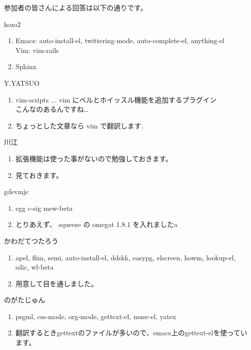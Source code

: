 \documentclass[mingoth,a4paper]{jsarticle}
\begin{document}
参加者の皆さんによる回答は以下の通りです。

\begin{prework}{ kozo2 }
  \begin{enumerate}
  \item Emacs: auto-install-el, twittering-mode, auto-complete-el, anything-el\\
    Vim: vim-rails
  \item Sphinx
  \end{enumerate}
\end{prework}

\begin{prework}{ Y.YATSUO }
  \begin{enumerate}
  \item vim-scripts ... vim にベルとホイッスル機能を追加するプラグイン \\
    こんなのあるんですね…
  \item ちょっとした文章なら vim で翻訳します.
  \end{enumerate}
\end{prework}

\begin{prework}{ 川江 }
  \begin{enumerate}
  \item 拡張機能は使った事がないので勉強しておきます。
  \item 見ておきます。
  \end{enumerate}
\end{prework}

\begin{prework}{ gdevmjc }
  \begin{enumerate}
  \item egg c-sig mew-beta
  \item とりあえず、 squeeze の omegat 1.8.1 を入れましたa
  \end{enumerate}
\end{prework}

\begin{prework}{ かわだてつたろう }
 \begin{enumerate}
  \item apel, flim, semi, auto-install-el, ddskk, easypg, elscreen, howm,
        lookup-el, sdic, wl-beta
  \item 用意して目を通しました。 
 \end{enumerate}
\end{prework}

\begin{prework}{ のがたじゅん }
 \begin{enumerate}
  \item psgml, css-mode, org-mode, gettext-el, muse-el, yatex
  \item 翻訳するときgettextのファイルが多いので、emacs上のgettext-elを使っています。
 \end{enumerate}
\end{prework}
\end{document}
